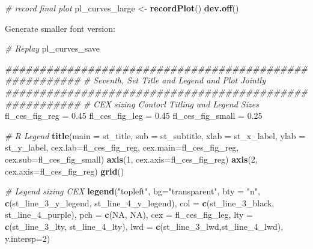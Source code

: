 \documentclass[
]{book}
\newenvironment{Shaded}{\begin{snugshade}}{\end{snugshade}}
\newcommand{\CommentTok}[1]{\textcolor[rgb]{0.56,0.35,0.01}{\textit{#1}}}
\newcommand{\DataTypeTok}[1]{\textcolor[rgb]{0.13,0.29,0.53}{#1}}
\newcommand{\DecValTok}[1]{\textcolor[rgb]{0.00,0.00,0.81}{#1}}
\newcommand{\FloatTok}[1]{\textcolor[rgb]{0.00,0.00,0.81}{#1}}
\newcommand{\KeywordTok}[1]{\textcolor[rgb]{0.13,0.29,0.53}{\textbf{#1}}}
\newcommand{\NormalTok}[1]{#1}
\newcommand{\OtherTok}[1]{\textcolor[rgb]{0.56,0.35,0.01}{#1}}
\newcommand{\StringTok}[1]{\textcolor[rgb]{0.31,0.60,0.02}{#1}}
\begin{document}
\begin{Shaded}
\begin{Highlighting}[]
\CommentTok{\# record final plot}
\NormalTok{pl\_curves\_large \textless{}{-}}\StringTok{ }\KeywordTok{recordPlot}\NormalTok{()}
\KeywordTok{dev.off}\NormalTok{()}
\end{Highlighting}
\end{Shaded}

Generate smaller font version:

\begin{Shaded}
\begin{Highlighting}[]
\CommentTok{\# Replay}
\NormalTok{pl\_curves\_save}

\CommentTok{\#\#\#\#\#\#\#\#\#\#\#\#\#\#\#\#\#\#\#\#\#\#\#\#\#\#\#\#\#\#\#\#\#\#\#\#\#\#\#\#\#\#\#\#\#\#\#\#\#\#\#\#\#\#\#}
\CommentTok{\# Seventh, Set Title and Legend and Plot Jointly}
\CommentTok{\#\#\#\#\#\#\#\#\#\#\#\#\#\#\#\#\#\#\#\#\#\#\#\#\#\#\#\#\#\#\#\#\#\#\#\#\#\#\#\#\#\#\#\#\#\#\#\#\#\#\#\#\#\#\#}
\CommentTok{\# CEX sizing Contorl Titling and Legend Sizes}
\NormalTok{fl\_ces\_fig\_reg =}\StringTok{ }\FloatTok{0.45}
\NormalTok{fl\_ces\_fig\_leg =}\StringTok{ }\FloatTok{0.45}
\NormalTok{fl\_ces\_fig\_small =}\StringTok{ }\FloatTok{0.25}

\CommentTok{\# R Legend}
\KeywordTok{title}\NormalTok{(}\DataTypeTok{main =}\NormalTok{ st\_title, }\DataTypeTok{sub =}\NormalTok{ st\_subtitle, }\DataTypeTok{xlab =}\NormalTok{ st\_x\_label, }\DataTypeTok{ylab =}\NormalTok{ st\_y\_label,}
      \DataTypeTok{cex.lab=}\NormalTok{fl\_ces\_fig\_reg,}
      \DataTypeTok{cex.main=}\NormalTok{fl\_ces\_fig\_reg,}
      \DataTypeTok{cex.sub=}\NormalTok{fl\_ces\_fig\_small)}
\KeywordTok{axis}\NormalTok{(}\DecValTok{1}\NormalTok{, }\DataTypeTok{cex.axis=}\NormalTok{fl\_ces\_fig\_reg)}
\KeywordTok{axis}\NormalTok{(}\DecValTok{2}\NormalTok{, }\DataTypeTok{cex.axis=}\NormalTok{fl\_ces\_fig\_reg)}
\KeywordTok{grid}\NormalTok{()}

\CommentTok{\# Legend sizing CEX}
\KeywordTok{legend}\NormalTok{(}\StringTok{"topleft"}\NormalTok{,}
       \DataTypeTok{bg=}\StringTok{"transparent"}\NormalTok{,}
       \DataTypeTok{bty =} \StringTok{"n"}\NormalTok{,}
       \KeywordTok{c}\NormalTok{(st\_line\_}\DecValTok{3}\NormalTok{\_y\_legend, st\_line\_}\DecValTok{4}\NormalTok{\_y\_legend),}
       \DataTypeTok{col =} \KeywordTok{c}\NormalTok{(st\_line\_}\DecValTok{3}\NormalTok{\_black, st\_line\_}\DecValTok{4}\NormalTok{\_purple),}
       \DataTypeTok{pch =} \KeywordTok{c}\NormalTok{(}\OtherTok{NA}\NormalTok{, }\OtherTok{NA}\NormalTok{),}
       \DataTypeTok{cex =}\NormalTok{ fl\_ces\_fig\_leg,}
       \DataTypeTok{lty =} \KeywordTok{c}\NormalTok{(st\_line\_}\DecValTok{3}\NormalTok{\_lty, st\_line\_}\DecValTok{4}\NormalTok{\_lty),}
       \DataTypeTok{lwd =} \KeywordTok{c}\NormalTok{(st\_line\_}\DecValTok{3}\NormalTok{\_lwd,st\_line\_}\DecValTok{4}\NormalTok{\_lwd),}
       \DataTypeTok{y.intersp=}\DecValTok{2}\NormalTok{)}
\end{Highlighting}
\end{Shaded}
\end{document}
